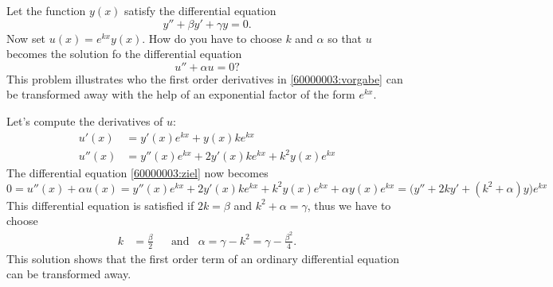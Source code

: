 Let the function
$y(x)$
satisfy the differential equation
\begin{equation}
y''+\beta y' + \gamma y=0.
\label{60000003:vorgabe}
\end{equation}
Now set
$u(x)=e^{k x}y(x)$.
How do you have to choose $k$ and $\alpha$ so that $u$ becomes the solution
fo the differential equation
\begin{equation}
u''+\alpha u=0?
\label{60000003:ziel}
\end{equation}
This problem illustrates who the first order derivatives in
\eqref{60000003:vorgabe}
can be transformed away with the help of an exponential factor
of the form $e^{kx}$.

\begin{loesung}
Let's compute the derivatives of $u$:
\begin{align*}
u'(x)&=y'(x)e^{kx}+y(x)ke^{kx}\\
u''(x)&=y''(x)e^{kx}+2y'(x)ke^{kx}+k^2y(x)e^{kx}
\end{align*}
The differential equation 
\eqref{60000003:ziel} now becomes
\[
0
=
u''(x)+\alpha u(x)
=
y''(x)e^{kx}+2y'(x)ke^{kx}+k^2y(x)e^{kx}
+ \alpha y(x)e^{kx}
=
\bigl(
y''+2k y' +(k^2+\alpha)y
\bigr)
e^{kx}
\]
This differential equation is satisfied if 
$2k=\beta$ and
$k^2+\alpha=\gamma$, thus we have to choose
\[
\begin{aligned}
k&=\frac{\beta}2
&
&\text{and}&
\alpha=\gamma-k^2=\gamma-\frac{\beta^2}4.
\end{aligned}
\]
This solution shows that the first order term of an ordinary differential
equation can be transformed away.
\end{loesung}

